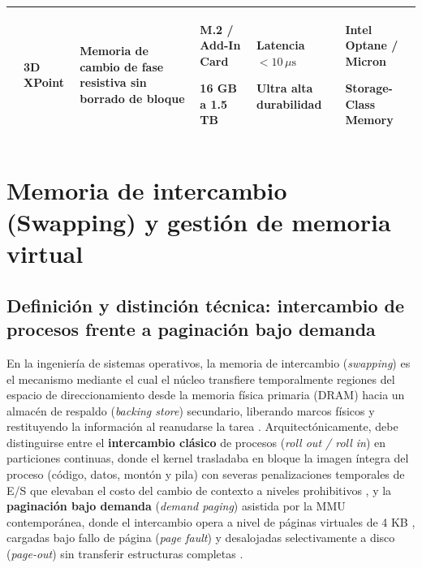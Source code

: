 \documentclass[12pt]{article}
\begin{document}
\begin{table}[htbp]
\begin{tabularx}{\textwidth}{>{\centering\arraybackslash}m{1.2cm} >{\centering\arraybackslash}m{2.2cm} X >{\centering\arraybackslash}m{1.8cm} >{\centering\arraybackslash}m{2.0cm} >{\centering\arraybackslash}m{2.2cm}}
\addlinespace
2015 & 3D XPoint & Memoria de cambio de fase resistiva sin borrado de bloque & M.2 / Add-In Card \par 16 GB a 1.5 TB & Latencia $< 10\,\mu\text{s}$ \par Ultra alta durabilidad & Intel Optane / Micron \par Storage-Class Memory \\
\bottomrule
\end{tabularx}
\end{table}

\clearpage

\section{Memoria de intercambio (Swapping) y gestión de memoria virtual}

\subsection{Definición y distinción técnica: intercambio de procesos frente a paginación bajo demanda}

En la ingeniería de sistemas operativos, la memoria de intercambio (\textit{swapping}) es el mecanismo mediante el cual el núcleo transfiere temporalmente regiones del espacio de direccionamiento desde la memoria física primaria (DRAM) hacia un almacén de respaldo (\textit{backing store}) secundario, liberando marcos físicos y restituyendo la información al reanudarse la tarea \parencite[\S 8.2, p.\ 249]{silberschatz2006fundamentos}. Arquitectónicamente, debe distinguirse entre el \textbf{intercambio clásico} de procesos (\textit{roll out / roll in}) en particiones continuas, donde el kernel trasladaba en bloque la imagen íntegra del proceso (código, datos, montón y pila) con severas penalizaciones temporales de E/S que elevaban el costo del cambio de contexto a niveles prohibitivos \parencite[\S 7.2, p.\ 343]{stallings2018operating}, y la \textbf{paginación bajo demanda} (\textit{demand paging}) asistida por la MMU contemporánea, donde el intercambio opera a nivel de páginas virtuales de 4 KB \parencite[\S 4.6, p.\ 165]{carretero2001sistemas}, cargadas bajo fallo de página (\textit{page fault}) y desalojadas selectivamente a disco (\textit{page-out}) sin transferir estructuras completas \parencite[\S 9.2, p.\ 283]{silberschatz2006fundamentos}.
\end{document}
